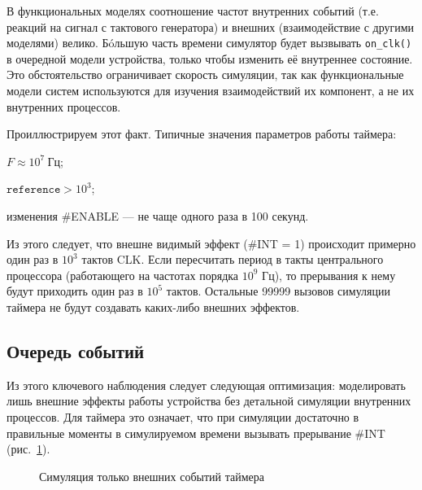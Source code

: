 В функциональных моделях соотношение частот внутренних событий (т.е. реакций на сигнал с тактового генератора) и внешних (взаимодействие с другими моделями) велико. Бóльшую часть времени симулятор будет вызвывать \texttt{on_clk()} в очередной модели устройства, только чтобы изменить её внутреннее состояние. Это обстоятельство ограничивает скорость симуляции, так как функциональные модели систем используются для изучения взаимодействий их компонент, а не их внутренних процессов.

Проиллюстрируем этот факт. Типичные значения параметров работы таймера:

\begin{itemize*}
    \item $F \approx 10^7\ \text{Гц}$;
    \item $\mathtt{reference} > 10^3$;
    \item изменения \#ENABLE — не чаще одного раза в 100 секунд.
\end{itemize*}

Из этого следует, что внешне видимый эффект (\#INT = 1) происходит примерно один раз в $10^3$ тактов CLK. Если пересчитать период в такты центрального процессора (работающего на частотах порядка $10^9$ Гц), то прерывания к нему будут приходить один раз в $10^5$ тактов. Остальные 99999 вызовов симуляции таймера не будут создавать каких-либо внешних эффектов.

\subsection{Очередь событий}

Из этого ключевого наблюдения следует следующая оптимизация: моделировать лишь внешние эффекты работы устройства без детальной симуляции внутренних процессов. Для таймера это означает, что при симуляции достаточно в правильные моменты в симулируемом времени вызывать прерывание \#INT (рис. \ref{fig:timer-events}).

\begin{figure}[htp]
    \centering
    \caption[Симуляция только внешних событий таймера]{Симуляция только внешних событий таймера}
    \label{fig:timer-events}
\end{figure}

